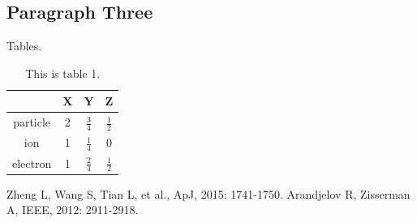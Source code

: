 \documentclass[11pt, a4paper]{article}
\numberwithin{equation}{section} %
\begin{document}
	\subsection{Paragraph Three}

		Tables.

		\begin{table}[h]
			\renewcommand\arraystretch{2}
			\centering
			\caption{This is table 1.}
			\begin{tabular}{|c|c|c|c|}
				\hline \        & X & Y             & Z             \\
				\hline particle & 2 & $\frac{3}{4}$ & $\frac{1}{2}$ \\
				\hline ion      & 1 & $\frac{1}{4}$ & 0             \\
				\hline electron & 1 & $\frac{2}{4}$ & $\frac{1}{2}$ \\
				\hline
			\end{tabular}
		\end{table}



	\begin{thebibliography}{99} 
		Zheng L, Wang S, Tian L, et al., ApJ, 2015: 1741-1750.  
		Arandjelov R, Zisserman A, IEEE, 2012: 2911-2918.  
	\end{thebibliography}

\end{document}
